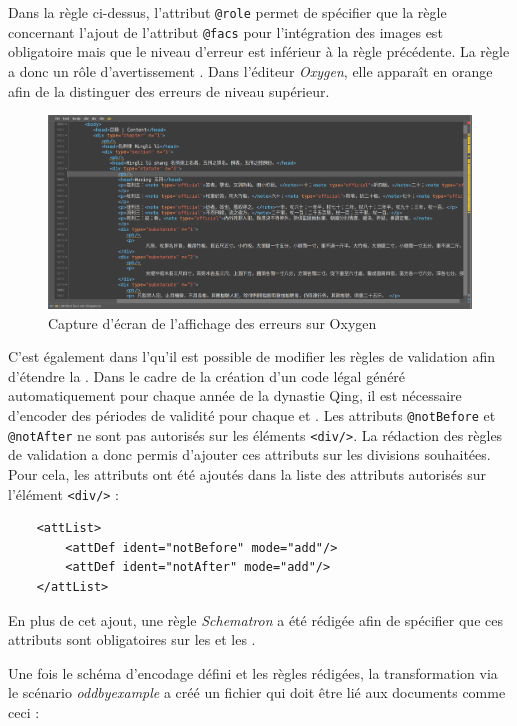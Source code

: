 Dans la règle ci-dessus, l'attribut \texttt{@role} permet de spécifier que la règle concernant l'ajout de l'attribut \texttt{@facs} pour l'intégration des images est obligatoire mais que le niveau d'erreur est inférieur à la règle précédente. La règle a donc un rôle d'\og avertissement \fg. Dans l'éditeur \textit{Oxygen}, elle apparaît en orange afin de la distinguer des erreurs de niveau supérieur.
 \begin{figure}
     \centering
     \includegraphics[width=\textwidth]{images/oxygen.png}
     \caption{Capture d'écran de l'affichage des erreurs sur Oxygen}
 \end{figure}

 \newpage
 C'est également dans l'\ODD qu'il est possible de modifier les règles de validation afin d'étendre la \TEI. Dans le cadre de la création d'un code légal généré automatiquement pour chaque année de la dynastie Qing, il est nécessaire d'encoder des périodes de validité pour chaque \lu et \li. Les attributs \texttt{@notBefore} et \texttt{@notAfter} ne sont pas autorisés sur les éléments \texttt{<div/>}. La rédaction des règles de validation a donc permis d'ajouter ces attributs sur les divisions souhaitées. Pour cela, les attributs ont été ajoutés dans la liste des attributs autorisés sur l'élément \texttt{<div/>} : 

 \begin{verbatim}
    <attList>
        <attDef ident="notBefore" mode="add"/>
        <attDef ident="notAfter" mode="add"/>
    </attList>
 \end{verbatim}

En plus de cet ajout, une règle \textit{Schematron} a été rédigée afin de spécifier que ces attributs sont obligatoires sur les \lu et les \li. 

Une fois le schéma d'encodage défini et les règles rédigées, la transformation via le scénario \textit{oddbyexample} a créé un fichier \RNG qui doit être lié aux documents \TEI comme ceci : 

